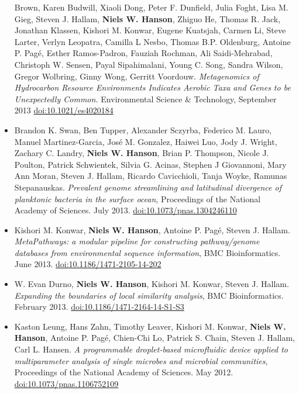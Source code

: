 \documentclass[print]{hanson_cv} %
\begin{document}
\begin{itemize}
  Brown, Karen Budwill, Xiaoli Dong, Peter F. Dunfield, Julia Foght,
  Lisa M. Gieg, Steven J. Hallam, \textbf{Niels W. Hanson}, Zhiguo He,
  Thomas R. Jack, Jonathan Klassen, Kishori M. Konwar, Eugene Kuatsjah,
  Carmen Li, Steve Larter, Verlyn Leopatra, Camilla L Nesbo, Thomas B.P.
  Oldenburg, Antoine P. Pag\'{e}, Esther Ramos-Padron, Fauziah Rochman, Ali
  Saidi-Mehrabad, Christoph W. Sensen, Payal Sipahimalani, Young C.
  Song, Sandra Wilson, Gregor Wolbring, Ginny Wong, Gerritt Voordouw.
   \emph{Metagenomics of Hydrocarbon Resource Environments Indicates Aerobic
  Taxa and Genes to be Unexpectedly Common.} Environmental Science
  \& Technology, September 2013
  \href{http://dx.doi.org/10.1021/es4020184}{doi:10.1021/es4020184}
\item
  Brandon K. Swan, Ben Tupper, Alexander Sczyrba, Federico M. Lauro,
  Manuel Martinez-Garcia, Jos\'{e} M. Gonzalez, Haiwei Luo, Jody J. Wright,
  Zachary C. Landry, \textbf{Niels W. Hanson}, Brian P. Thompson, Nicole
  J. Poulton, Patrick Schwientek, Silvia G. Acinas, Stephen J
  Giovannoni, Mary Ann Moran, Steven J. Hallam, Ricardo Cavicchioli,
  Tanja Woyke, Ramunas Stepanauskas. \emph{Prevalent genome streamlining
  and latitudinal divergence of planktonic bacteria in the surface
  ocean}, Proceedings of the National Academy of Sciences. July 2013.
  \href{http://dx.doi.org/10.1073/pnas.1304246110}{doi:10.1073/pnas.1304246110}
\item
  Kishori M. Konwar, \textbf{Niels W. Hanson}, Antoine P. Pag\'{e}, Steven
  J. Hallam. \emph{MetaPathways: a modular pipeline for constructing
  pathway/genome databases from environmental sequence information}, BMC
  Bioinformatics. June 2013. \href{http://dx.doi.org/10.1186/1471-2105-14-202}{doi:10.1186/1471-2105-14-202}
\item
  W. Evan Durno, \textbf{Niels W. Hanson}, Kishori M. Konwar, Steven J.
  Hallam. \emph{Expanding the boundaries of local similarity analysis}, BMC Bioinformatics.
  February 2013. \href{http://dx.doi.org/10.1186/1471-2164-14-S1-S3}{doi:10.1186/1471-2164-14-S1-S3}
\item
  Kaston Leung, Hans Zahn, Timothy Leaver, Kishori M. Konwar,
  \textbf{Niels W. Hanson}, Antoine P. Pag\'{e}, Chien-Chi Lo, Patrick S.
  Chain, Steven J. Hallam, Carl L. Hansen. \emph{A programmable
  droplet-based microfluidic device applied to multiparameter analysis
  of single microbes and microbial communities}, Proceedings of the
  National Academy of Sciences. May 2012.
  \href{http://dx.doi.org/10.1073/pnas.1106752109}{doi:10.1073/pnas.1106752109}
\end{itemize}
\end{document}
